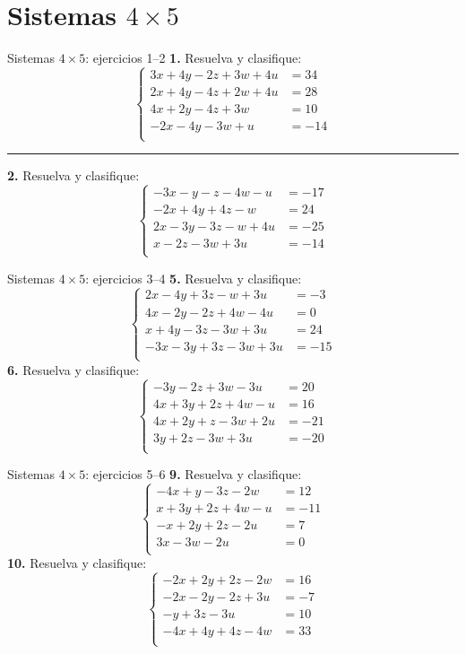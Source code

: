 \documentclass[aspectratio=169,9pt]{beamer}
\theoremstyle{remark}
\begin{document}
\section{Sistemas $4\times 5$}
\begin{frame}{Sistemas $4\times 5$: ejercicios 1--2}
\scriptsize
\textbf{1.} Resuelva y clasifique:
\[\left\{\begin{aligned}
3x+4y-2z+3w+4u&=34\\
2x+4y-4z+2w+4u&=28\\
4x+2y-4z+3w&=10\\
-2x-4y-3w+u&=-14\\
\end{aligned}\right.\]
\vspace{0.2em}\hrule\vspace{0.3em}
\textbf{2.} Resuelva y clasifique:
\[\left\{\begin{aligned}
-3x-y-z-4w-u&=-17\\
-2x+4y+4z-w&=24\\
2x-3y-3z-w+4u&=-25\\
x-2z-3w+3u&=-14\\
\end{aligned}\right.\]
\end{frame}
\begin{frame}{Sistemas $4\times 5$: ejercicios 3--4}
\scriptsize
\textbf{5.} Resuelva y clasifique:
\[\left\{\begin{aligned}
2x-4y+3z-w+3u&=-3\\
4x-2y-2z+4w-4u&=0\\
x+4y-3z-3w+3u&=24\\
-3x-3y+3z-3w+3u&=-15\\
\end{aligned}\right.\]
\textbf{6.} Resuelva y clasifique:
\[\left\{\begin{aligned}
-3y-2z+3w-3u&=20\\
4x+3y+2z+4w-u&=16\\
4x+2y+z-3w+2u&=-21\\
3y+2z-3w+3u&=-20\\
\end{aligned}\right.\]
\end{frame}
\begin{frame}{Sistemas $4\times 5$: ejercicios 5--6}
\scriptsize
\textbf{9.} Resuelva y clasifique:
\[\left\{\begin{aligned}
-4x+y-3z-2w&=12\\
x+3y+2z+4w-u&=-11\\
-x+2y+2z-2u&=7\\
3x-3w-2u&=0\\
\end{aligned}\right.\]
\textbf{10.} Resuelva y clasifique:
\[\left\{\begin{aligned}
-2x+2y+2z-2w&=16\\
-2x-2y-2z+3u&=-7\\
-y+3z-3u&=10\\
-4x+4y+4z-4w&=33\\
\end{aligned}\right.\]
\end{frame}
\end{document}

